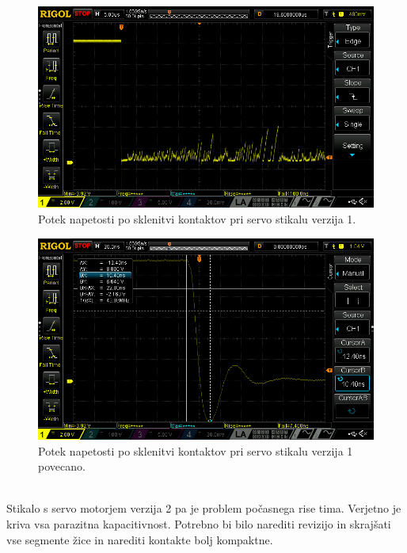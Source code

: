 \documentclass[a4paper,twoside,openright,12pt,slovene]{book}
\begin{document}
    \begin{figure}[H]
        \centering
        \includegraphics[width=1\columnwidth]{Slike/ServoStikalo1/ServoStikalo1.png}
        \caption{\label{ServoStikalo1} Potek napetosti po sklenitvi kontaktov pri servo stikalu verzija 1.}
    \end{figure}
    
    \begin{figure}[H]
        \centering
        \includegraphics[width=1\columnwidth]{Slike/ServoStikalo1/ServoStikalo1povecano.png}
        \caption{\label{ServoStikalo1povecano} Potek napetosti po sklenitvi kontaktov pri servo stikalu verzija 1 povecano.}
    \end{figure}
    
    ~\\Stikalo s servo motorjem verzija 2 pa je problem počasnega rise tima. Verjetno je kriva vsa parazitna kapacitivnost. Potrebno bi bilo narediti revizijo in skrajšati vse segmente žice in narediti kontakte bolj kompaktne. 
    
\end{document}
